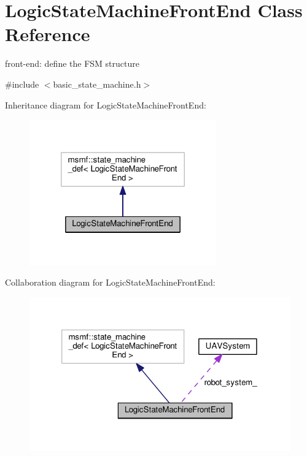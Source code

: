 \hypertarget{classLogicStateMachineFrontEnd}{\section{Logic\-State\-Machine\-Front\-End Class Reference}
\label{classLogicStateMachineFrontEnd}
}


front-\/end\-: define the F\-S\-M structure  




{\ttfamily \#include $<$basic\-\_\-state\-\_\-machine.\-h$>$}



Inheritance diagram for Logic\-State\-Machine\-Front\-End\-:\nopagebreak
\begin{figure}[H]
\begin{center}
\leavevmode
\includegraphics[width=228pt]{classLogicStateMachineFrontEnd__inherit__graph}
\end{center}
\end{figure}


Collaboration diagram for Logic\-State\-Machine\-Front\-End\-:\nopagebreak
\begin{figure}[H]
\begin{center}
\leavevmode
\includegraphics[width=320pt]{classLogicStateMachineFrontEnd__coll__graph}
\end{center}
\end{figure}
